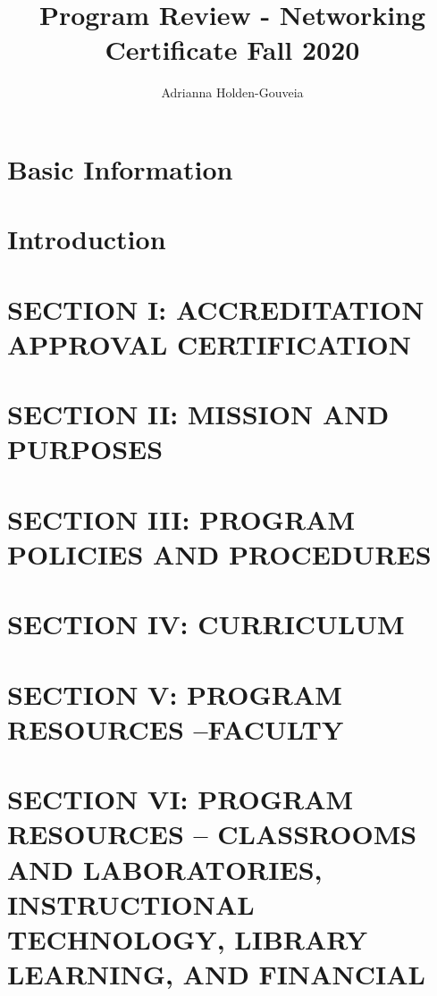 \documentclass[12pt,a4paper,man,natbib,donotrepeattitle, book]{apa6}
\title{Program Review - Networking Certificate Fall 2020}
\author{Adrianna Holden-Gouveia}
\affiliation{Northern Essex Community College}
\begin{document}
\maketitle
\doublespacing
\tableofcontents

\newpage
\section{Basic Information}


\section{Introduction}


\section{SECTION I: ACCREDITATION APPROVAL CERTIFICATION}
%


\section{SECTION II: MISSION AND PURPOSES}
%


\section{SECTION III: PROGRAM POLICIES AND PROCEDURES}
%

\section{SECTION IV: CURRICULUM}
%

\section{SECTION V: PROGRAM RESOURCES –FACULTY}
%

\section{SECTION VI: PROGRAM RESOURCES – CLASSROOMS AND LABORATORIES, INSTRUCTIONAL TECHNOLOGY, LIBRARY LEARNING, AND FINANCIAL}
%
\end{document}
